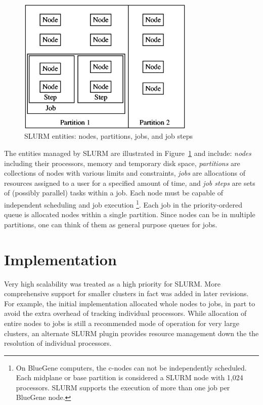 \documentclass{../common/acm}
\begin{document}
\begin{figure}[tcb]
\centerline{\includegraphics[width=3.32in]{../figures/entities2.eps}}
\caption{\small SLURM entities: nodes, partitions, jobs, and job steps}
\label{entities}
\end{figure}

The entities managed by SLURM are illustrated in Figure~\ref{entities}
and include:
{\em nodes} including their processors, memory and temporary disk space,
{\em partitions} are collections of nodes with various limits and constraints,
{\em jobs} are allocations of resources assigned
to a user for a specified amount of time, and
{\em job steps} are sets of (possibly parallel) tasks within a job.
Each node must be capable of independent scheduling and job execution
\footnote{On BlueGene computers, the c-nodes can not be independently
scheduled. Each midplane or base partition is considered a SLURM node
with 1,024 processors. SLURM supports the execution of more than one
job per BlueGene node.}.
Each job in the priority-ordered queue is allocated nodes within a single
partition.
Since nodes can be in multiple partitions, one can think of them as
general purpose queues for jobs.

\section{Implementation}

Very high scalability was treated as a high priority for SLURM.
More comprehensive support for smaller clusters in fact was
added in later revisions.
For example, the initial implementation allocated whole nodes
to jobs, in part to avoid the extra overhead of tracking individual
processors.
While allocation of entire nodes to jobs is still a recommended mode of
operation for very large clusters, an alternate SLURM plugin provides
resource management down the the resolution of individual processors.
\end{document}
